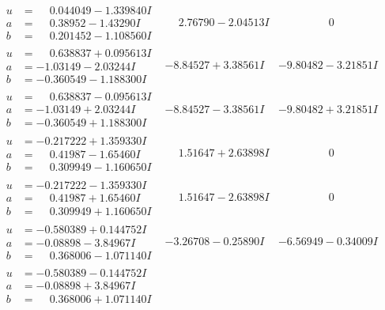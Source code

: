 \documentclass[1p]{elsarticle_modified}
\theoremstyle{definition}
\begin{document}
$$\begin{array}{c|c|c}
\begin{aligned}
u &= \phantom{-}0.044049 - 1.339840 I \\
a &= \phantom{-}0.38952 - 1.43290 I \\
b &= \phantom{-}0.201452 - 1.108560 I\end{aligned}
 & \phantom{-}2.76790 - 2.04513 I & \phantom{-0.000000 } 0 \\ \hline\begin{aligned}
u &= \phantom{-}0.638837 + 0.095613 I \\
a &= -1.03149 - 2.03244 I \\
b &= -0.360549 - 1.188300 I\end{aligned}
 & -8.84527 + 3.38561 I & -9.80482 - 3.21851 I \\ \hline\begin{aligned}
u &= \phantom{-}0.638837 - 0.095613 I \\
a &= -1.03149 + 2.03244 I \\
b &= -0.360549 + 1.188300 I\end{aligned}
 & -8.84527 - 3.38561 I & -9.80482 + 3.21851 I \\ \hline\begin{aligned}
u &= -0.217222 + 1.359330 I \\
a &= \phantom{-}0.41987 - 1.65460 I \\
b &= \phantom{-}0.309949 - 1.160650 I\end{aligned}
 & \phantom{-}1.51647 + 2.63898 I & \phantom{-0.000000 } 0 \\ \hline\begin{aligned}
u &= -0.217222 - 1.359330 I \\
a &= \phantom{-}0.41987 + 1.65460 I \\
b &= \phantom{-}0.309949 + 1.160650 I\end{aligned}
 & \phantom{-}1.51647 - 2.63898 I & \phantom{-0.000000 } 0 \\ \hline\begin{aligned}
u &= -0.580389 + 0.144752 I \\
a &= -0.08898 - 3.84967 I \\
b &= \phantom{-}0.368006 - 1.071140 I\end{aligned}
 & -3.26708 - 0.25890 I & -6.56949 - 0.34009 I \\ \hline\begin{aligned}
u &= -0.580389 - 0.144752 I \\
a &= -0.08898 + 3.84967 I \\
b &= \phantom{-}0.368006 + 1.071140 I\end{aligned}

\end{array}$$
\end{document}

